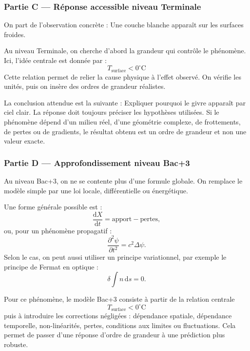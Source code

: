 \documentclass[11pt,a4paper]{article}
\begin{document}
\subsubsection*{Partie C — Réponse accessible niveau Terminale}

\begin{corrigebox}
On part de l'observation concrète : Une couche blanche apparaît sur les surfaces froides.

Au niveau Terminale, on cherche d'abord la grandeur qui contrôle le phénomène. Ici, l'idée centrale est donnée par :
\[
T_{\mathrm{surface}}<0^\circ\mathrm C
\]
Cette relation permet de relier la cause physique à l'effet observé. On vérifie les unités, puis on insère des ordres de grandeur réalistes.

La conclusion attendue est la suivante : Expliquer pourquoi le givre apparaît par ciel clair. La réponse doit toujours préciser les hypothèses utilisées. Si le phénomène dépend d'un milieu réel, d'une géométrie complexe, de frottements, de pertes ou de gradients, le résultat obtenu est un ordre de grandeur et non une valeur exacte.
\end{corrigebox}

\subsubsection*{Partie D — Approfondissement niveau Bac+3}

\begin{approfondissementbox}
Au niveau Bac+3, on ne se contente plus d'une formule globale. On remplace le modèle simple par une loi locale, différentielle ou énergétique.

Une forme générale possible est :
\[
\frac{\mathrm d X}{\mathrm dt}=\text{apport}-\text{pertes},
\]
ou, pour un phénomène propagatif :
\[
\frac{\partial^2 \psi}{\partial t^2}=c^2\Delta\psi.
\]
Selon le cas, on peut aussi utiliser un principe variationnel, par exemple le principe de Fermat en optique :
\[
\delta \int n\,\mathrm ds=0.
\]

Pour ce phénomène, le modèle Bac+3 consiste à partir de la relation centrale
\[
T_{\mathrm{surface}}<0^\circ\mathrm C
\]
puis à introduire les corrections négligées : dépendance spatiale, dépendance temporelle, non-linéarités, pertes, conditions aux limites ou fluctuations. Cela permet de passer d'une réponse d'ordre de grandeur à une prédiction plus robuste.
\end{approfondissementbox}
\end{document}
